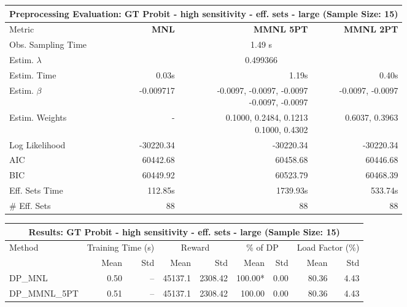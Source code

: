 
\begin{samepage}
\begin{center}
  \small
  \begin{tabular}{l|r|r|r}
    \toprule
    \multicolumn{4}{c}{\textbf{Preprocessing Evaluation: GT Probit - high sensitivity - eff. sets - large (Sample Size: 15)}} \\
    \midrule
    Metric & \textbf{MNL} & \textbf{MMNL 5PT} & \textbf{MMNL 2PT} \\
    \midrule
    Obs. Sampling Time & \multicolumn{3}{c}{1.49 s} \\
    Estim. $\lambda$ & \multicolumn{3}{c}{0.499366} \\
    Estim. Time & 0.03s & 1.19s & 0.40s \\
    Estim. $\beta$ & -0.009717 & \makecell[tr]{-0.0097, -0.0097, -0.0097 \\ -0.0097, -0.0097} & -0.0097, -0.0097 \\
    Estim. Weights & - & \makecell[tr]{0.1000, 0.2484, 0.1213 \\ 0.1000, 0.4302} & 0.6037, 0.3963 \\
    Log Likelihood & -30220.34 & -30220.34 & -30220.34 \\
    AIC & 60442.68 & 60458.68 & 60446.68 \\
    BIC & 60449.92 & 60523.79 & 60468.39 \\
    Eff. Sets Time & 112.85s & 1739.93s & 533.74s \\
    \# Eff. Sets & 88 & 88 & 88 \\
    \bottomrule
  \end{tabular}
\end{center}
\begin{center}
  \small
  \begin{tabular}{l|rr|rr|rr|rr}
    \toprule
    \multicolumn{9}{c}{\textbf{Results: GT Probit - high sensitivity - eff. sets - large (Sample Size: 15)}} \\
    \midrule
    Method & \multicolumn{2}{c|}{Training Time (s)} & \multicolumn{2}{c|}{Reward} & \multicolumn{2}{c|}{\% of DP} & \multicolumn{2}{c}{Load Factor (\%)} \\
    & Mean & Std & Mean & Std & Mean & Std & Mean & Std \\
    \midrule
    DP\_MNL      &     0.50 &    -- &    45137.1 &    2308.42 & 100.00* &    0.00 &   80.36 &    4.43 \\
    DP\_MMNL\_5PT &     0.51 &    -- &    45137.1 &    2308.42 &  100.00 &    0.00 &   80.36 &    4.43 \\

\end{tabular}
\end{center}
\end{samepage}
